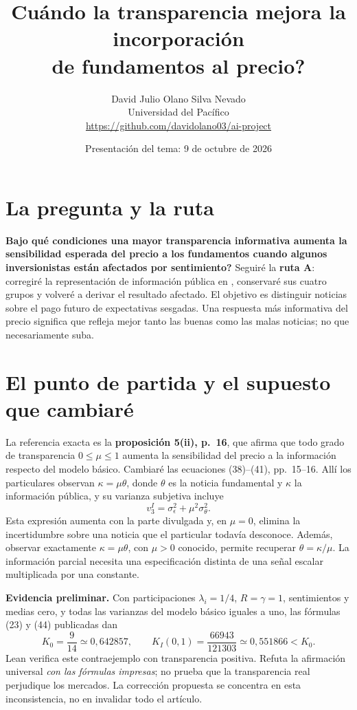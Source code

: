 \documentclass[11pt]{article}
\title{\textbf{\textquestiondown{}Cuándo la transparencia mejora la incorporación\\
de fundamentos al precio?}}
\author{David Julio Olano Silva Nevado\\
\small Universidad del Pacífico\\
\small\url{https://github.com/davidolano03/ai-project}}
\date{Presentación del tema: 9 de octubre de 2026}
\begin{document}
\maketitle

\section{La pregunta y la ruta}
\textbf{\textquestiondown{}Bajo qué condiciones una mayor transparencia informativa aumenta la
sensibilidad esperada del precio a los fundamentos cuando algunos
inversionistas están afectados por sentimiento?} Seguiré la \textbf{ruta A}:
corregiré la representación de información pública en \citet{zhang2023},
conservaré sus cuatro grupos y volveré a derivar el resultado afectado.
El objetivo es distinguir noticias sobre el pago futuro de expectativas
sesgadas. Una respuesta más informativa del precio significa que refleja
mejor tanto las buenas como las malas noticias; no que necesariamente suba.

\section{El punto de partida y el supuesto que cambiaré}
La referencia exacta es la \textbf{proposición 5(ii), p.~16}, que afirma que
todo grado de transparencia $0\leq\mu\leq1$ aumenta la sensibilidad del precio
a la información respecto del modelo básico. Cambiaré las ecuaciones
(38)--(41), pp.~15--16. Allí los particulares observan
$\kappa=\mu\theta$, donde $\theta$ es la noticia fundamental y $\kappa$ la
información pública, y su varianza subjetiva incluye
\begin{equation}\label{eq:printed}
  v_3^I=\sigma_\epsilon^2+\mu^2\sigma_\theta^2.
\end{equation}
Esta expresión aumenta con la parte divulgada y, en $\mu=0$, elimina la
incertidumbre sobre una noticia que el particular todavía desconoce.
Además, observar exactamente $\kappa=\mu\theta$, con $\mu>0$ conocido,
permite recuperar $\theta=\kappa/\mu$. La información parcial necesita una
especificación distinta de una señal escalar multiplicada por una constante.

\textbf{Evidencia preliminar.} Con participaciones $\lambda_i=1/4$,
$R=\gamma=1$, sentimientos y medias cero, y todas las varianzas del modelo
básico iguales a uno, las fórmulas (23) y (44) publicadas dan
\[
 K_0=\frac9{14}\simeq0{,}642857,
 \qquad K_I(0{,}1)=\frac{66943}{121303}\simeq0{,}551866<K_0.
\]
Lean verifica este contraejemplo con transparencia positiva. Refuta la
afirmación universal \emph{con las fórmulas impresas}; no prueba que la
transparencia real perjudique los mercados. La corrección propuesta se
concentra en esta inconsistencia, no en invalidar todo el artículo.
\end{document}
